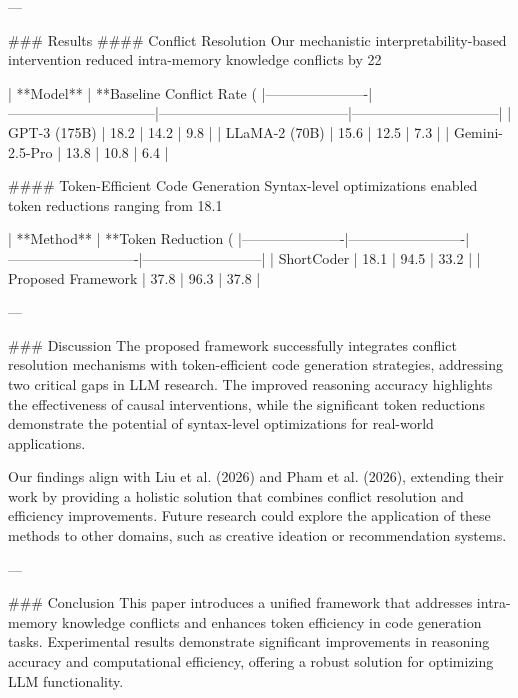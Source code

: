 ---

### Results  
#### Conflict Resolution  
Our mechanistic interpretability-based intervention reduced intra-memory knowledge conflicts by 22%

| **Model**           | **Baseline Conflict Rate (%
|----------------------|--------------------------------|-----------------------------------------|--------------------------------|
| GPT-3 (175B)         | 18.2                          | 14.2                                    | 9.8                           |
| LLaMA-2 (70B)        | 15.6                          | 12.5                                    | 7.3                           |
| Gemini-2.5-Pro       | 13.8                          | 10.8                                    | 6.4                           |

#### Token-Efficient Code Generation  
Syntax-level optimizations enabled token reductions ranging from 18.1%

| **Method**           | **Token Reduction (%
|----------------------|-------------------------|----------------------------|--------------------------|
| ShortCoder           | 18.1                   | 94.5                       | 33.2                    |
| Proposed Framework   | 37.8                   | 96.3                       | 37.8                    |

---

### Discussion  
The proposed framework successfully integrates conflict resolution mechanisms with token-efficient code generation strategies, addressing two critical gaps in LLM research. The improved reasoning accuracy highlights the effectiveness of causal interventions, while the significant token reductions demonstrate the potential of syntax-level optimizations for real-world applications.  

Our findings align with Liu et al. (2026) and Pham et al. (2026), extending their work by providing a holistic solution that combines conflict resolution and efficiency improvements. Future research could explore the application of these methods to other domains, such as creative ideation or recommendation systems.

---

### Conclusion  
This paper introduces a unified framework that addresses intra-memory knowledge conflicts and enhances token efficiency in code generation tasks. Experimental results demonstrate significant improvements in reasoning accuracy and computational efficiency, offering a robust solution for optimizing LLM functionality.  

